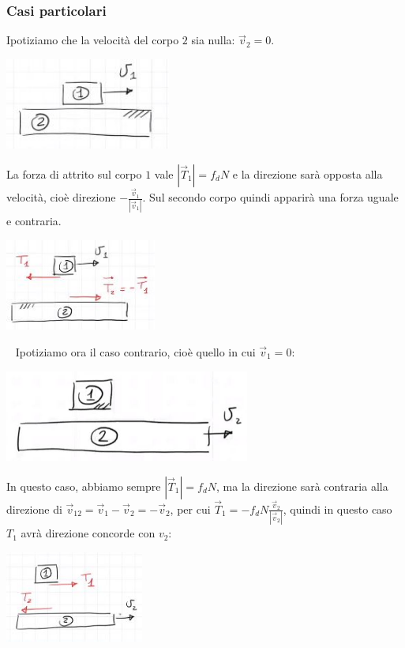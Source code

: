 \subsubsection{Casi particolari}
Ipotiziamo che la velocità del corpo $2$ sia nulla: $\vec{v}_2 = 0$.
\begin{center}
    \includegraphics[height=3cm]{../lezione11/img3.JPG}
\end{center}
La forza di attrito sul corpo $1$ vale $|\vec{T}_1| = f_d N$ e la direzione sarà opposta alla velocità, cioè direzione $- \frac{\vec{v}_1}{|\vec{v}_1|}$. Sul secondo corpo quindi apparirà una forza uguale e contraria.
\begin{center}
    \includegraphics[height=3cm]{../lezione11/img4.JPG}
\end{center}
\ \newline
Ipotiziamo ora il caso contrario, cioè quello in cui $\vec{v}_1 = 0$:
\begin{center}
    \includegraphics[height=3cm]{../lezione11/img5.JPG}
\end{center}
In questo caso, abbiamo sempre $|\vec{T}_1| = f_d N$, ma la direzione sarà contraria alla direzione di $\vec{v}_{12} = \vec{v}_1 - \vec{v}_2 = - \vec{v}_2$, per cui $\vec{T}_1 = - f_d N \frac{\vec{v}_2}{|\vec{v}_2|}$, quindi in questo caso $T_1$ avrà direzione concorde con $v_2$:
\begin{center}
    \includegraphics[height=3cm]{../lezione11/img6.JPG}
\end{center}